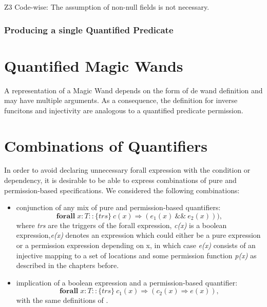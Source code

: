 \documentclass[12pt]{article}
\begin{document}
Z3 Code-wise: The assumption of non-null fields is not necessary.

\subsubsection{Producing a single Quantified Predicate}


\section{Quantified Magic Wands}
A representation of a Magic Wand\cite{magicwand} depends on the form of de wand definition and may have multiple arguments. As a consequence, the definition for inverse funcitons and injectivity are analogous to a quantified predicate permission.


\section{Combinations of Quantifiers}
In order to avoid declaring unnecessary forall expression with the condition or dependency, it is desirable to be able to express combinations of pure and permission-based specifications. We considered the following combinations:
\begin{itemize}
\item conjunction of any mix of pure and permission-based quantifiers:
\begin{equation}
	\mathbf{forall} \; x:T :: \{trs\}\  c(x) \Rightarrow (e_1(x)\ \&\& \ e_2(x))),
\end{equation}
where {\it trs} are the triggers of the forall expression, {\it c(x)} is  a boolean expression,{\it e(x)} denotes an expression which could either be a pure expression or a permission expression depending on x, in which case {\it e(x)} consists of an injective mapping to a set of locations and some permission function {\it p(x)} as described in the chapters before.

\item implication of a boolean expression and a permission-based quantifier:
\begin{equation}
	\mathbf{forall} \; x:T ::  \{trs\}\ c_1(x) \Rightarrow (c_2(x) \Rightarrow e(x)),
\end{equation}
with the same definitions of .
\end{itemize}
\end{document}
